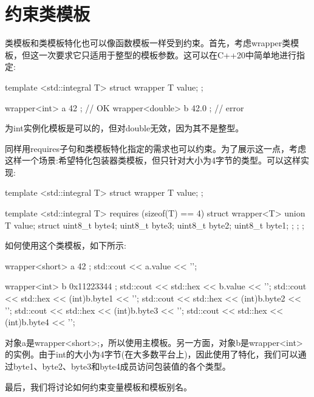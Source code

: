 \section{约束类模板}
类模板和类模板特化也可以像函数模板一样受到约束。首先，考虑wrapper类模板，但这一次要求它只适用于整型的模板参数。这可以在C++20中简单地进行指定:

\begin{cpp}
template <std::integral T>
struct wrapper
{
	T value;
};

wrapper<int> a{ 42 }; // OK
wrapper<double> b{ 42.0 }; // error
\end{cpp}

为int实例化模板是可以的，但对double无效，因为其不是整型。

同样用requires子句和类模板特化指定的需求也可以约束。为了展示这一点，考虑这样一个场景:希望特化包装器类模板，但只针对大小为4字节的类型。可以这样实现:

\begin{cpp}
template <std::integral T>
struct wrapper
{
	T value;
};

template <std::integral T>
requires (sizeof(T) == 4)
struct wrapper<T>
{
	union
	{
		T value;
		struct
		{
			uint8_t byte4;
			uint8_t byte3;
			uint8_t byte2;
			uint8_t byte1;
		};
	};
};
\end{cpp}

如何使用这个类模板，如下所示:

\begin{cpp}
wrapper<short> a{ 42 };
std::cout << a.value << '\n';

wrapper<int> b{ 0x11223344 };
std::cout << std::hex << b.value << '\n';
std::cout << std::hex << (int)b.byte1 << '\n';
std::cout << std::hex << (int)b.byte2 << '\n';
std::cout << std::hex << (int)b.byte3 << '\n';
std::cout << std::hex << (int)b.byte4 << '\n';
\end{cpp}

对象a是wrapper<short>;，所以使用主模板。另一方面，对象b是wrapper<int>的实例。由于int的大小为4字节(在大多数平台上)，因此使用了特化，我们可以通过byte1、byte2、byte3和byte4成员访问包装值的各个类型。

最后，我们将讨论如何约束变量模板和模板别名。




































































